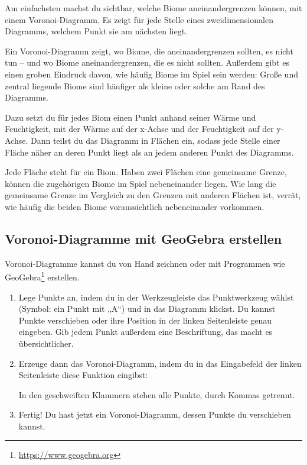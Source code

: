 Am einfachsten machst du sichtbar, welche Biome aneinandergrenzen
können, mit einem
Voronoi-Diagramm. Es zeigt für
jede Stelle eines zweidimensionalen Diagramms, welchem Punkt sie am
nächsten liegt.

Ein Voronoi-Diagramm zeigt, wo Biome, die aneinandergrenzen sollten, es
nicht tun -- und wo Biome aneinandergrenzen, die es nicht sollten.
Außerdem gibt es einen groben Eindruck davon, wie häufig Biome im Spiel
sein werden: Große und zentral liegende Biome sind häufiger als kleine
oder solche am Rand des Diagramms.

Dazu setzt du für jedes Biom einen Punkt anhand seiner Wärme und
Feuchtigkeit, mit der Wärme auf der x-Achse und der Feuchtigkeit auf der
y-Achse. Dann teilst du das Diagramm in Flächen ein, sodass jede Stelle
einer Fläche näher an deren Punkt liegt als an jedem anderen Punkt des
Diagramms.

Jede Fläche steht für ein Biom. Haben zwei Flächen eine gemeinsame
Grenze, können die zugehörigen Biome im Spiel nebeneinander liegen. Wie
lang die gemeinsame Grenze im Vergleich zu den Grenzen mit anderen
Flächen ist, verrät, wie häufig die beiden Biome voraussichtlich
nebeneinander vorkommen.

\subsection{Voronoi-Diagramme mit GeoGebra
erstellen}\label{voronoi-diagramme-mit-geogebra-erstellen}

Voronoi-Diagramme kannst du von Hand zeichnen oder mit Programmen wie
GeoGebra\footnote{\url{https://www.geogebra.org}} erstellen.

\begin{enumerate}
\def\labelenumi{\arabic{enumi}.}
\item
  Lege Punkte an, indem du in der Werkzeugleiste das Punktwerkzeug
  wählst (Symbol: ein Punkt mit „A``) und in das Diagramm klickst. Du
  kannst Punkte verschieben oder ihre Position in der linken
  Seitenleiste genau eingeben. Gib jedem Punkt außerdem eine
  Beschriftung, das macht es übersichtlicher.
\item
  Erzeuge dann das Voronoi-Diagramm, indem du in das Eingabefeld der
  linken Seitenleiste diese Funktion eingibst:

\begin{Shaded}
\begin{Highlighting}[]
\end{Highlighting}
\end{Shaded}

  In den geschweiften Klammern stehen alle Punkte, durch Kommas
  getrennt.
\item
  Fertig! Du hast jetzt ein Voronoi-Diagramm, dessen Punkte du
  verschieben kannst.
\end{enumerate}

